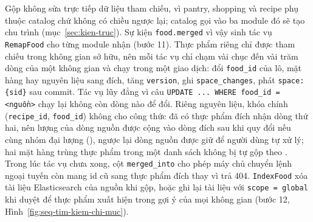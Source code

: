 Gộp không sửa trực tiếp dữ liệu tham chiếu, vì pantry, shopping và recipe phụ thuộc catalog chứ không có chiều ngược lại; catalog gọi vào ba module đó sẽ tạo chu trình (mục~\ref{sec:kien-truc}). Sự kiện \texttt{food.merged} vì vậy sinh tác vụ \texttt{RemapFood} cho từng module nhận (bước 11). Thực phẩm riêng chỉ được tham chiếu trong không gian sở hữu, nên mỗi tác vụ chỉ chạm vài chục đến vài trăm dòng của một không gian và chạy trong một giao dịch: đổi \texttt{food\_id} của lô, mặt hàng hay nguyên liệu sang đích, tăng \texttt{version}, ghi \texttt{space\_changes}, phát \texttt{space:\{sid\}} sau commit. Tác vụ lũy đẳng vì câu \texttt{UPDATE ... WHERE food\_id = <nguồn>} chạy lại không còn dòng nào để đổi. Riêng nguyên liệu, khóa chính (\texttt{recipe\_id}, \texttt{food\_id}) không cho công thức đã có thực phẩm đích nhận dòng thứ hai, nên lượng của dòng nguồn được cộng vào dòng đích sau khi quy đổi nếu cùng nhóm đại lượng (), ngược lại dòng nguồn được giữ để người dùng tự xử lý; hai mặt hàng trùng thực phẩm trong một danh sách không bị tự gộp theo . Trong lúc tác vụ chưa xong, cột \texttt{merged\_into} cho phép máy chủ chuyển lệnh ngoại tuyến còn mang id cũ sang thực phẩm đích thay vì trả 404. \texttt{IndexFood} xóa tài liệu Elasticsearch của nguồn khi gộp, hoặc ghi lại tài liệu với \texttt{scope = global} khi duyệt để thực phẩm xuất hiện trong gợi ý của mọi không gian (bước 12, Hình~\ref{fig:seq-tim-kiem-chi-muc}).
